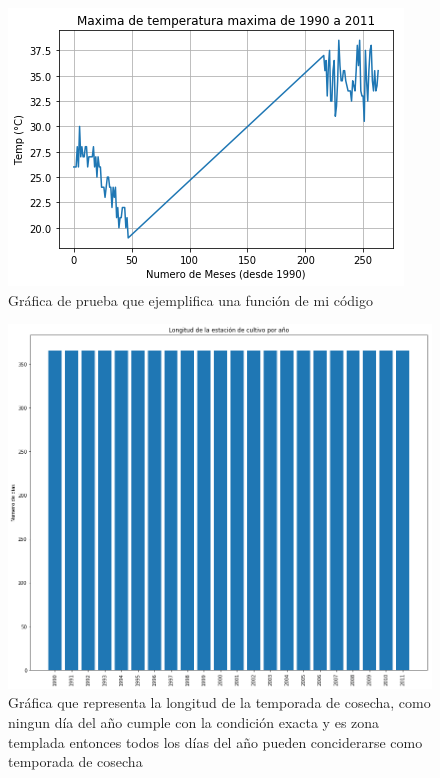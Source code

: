 \documentclass[12pt]{article}
\begin{document}
 \begin{figure}
     \centering
     \includegraphics{linea.png}
     \caption{Gráfica de prueba que ejemplifica una función de mi código}
     \label{fig:linea}
 \end{figure}
 \begin{figure}
    \centering
    \includegraphics[scale= .30]{cosechas.png}
    \caption{Gráfica que representa la longitud de la temporada de cosecha, como ningun día del año cumple con la condición exacta y es zona templada entonces todos los días del año pueden conciderarse como temporada de cosecha}
    \label{fig:indice4}
\end{figure}
\end{document}
